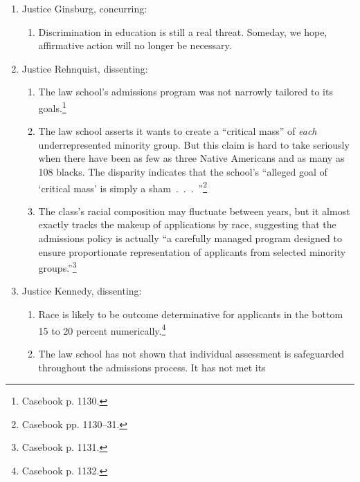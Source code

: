 \begin{enumerate}
\begin{enumerate}
        the school to sacrifice its ``nuanced judgment,'' which would harm 
        other educational values.\footnote{Casebook p. 1129.}
        \item ``[R]ace-conscious policies must be limited in time.~.~.~.~We 
        expect that 25 years from now, the use of racial preferences will no 
        longer be necessary to further the interest approved 
        today.''\footnote{Casebook p. 1129.}
    \end{enumerate}
    \item Justice Ginsburg, concurring:
    \begin{enumerate}
        \item Discrimination in education is still a real threat. Someday, 
        we hope, affirmative action will no longer be necessary.
    \end{enumerate}
    \item Justice Rehnquist, dissenting:
    \begin{enumerate}
        \item The law school's admissions program was not narrowly tailored to 
        its goals.\footnote{Casebook p. 1130.}
        \item The law school asserts it wants to create a ``critical mass'' of 
        \emph{each} underrepresented minority group. But this claim is hard to 
        take seriously when there have been as few as three Native Americans 
        and as many as 108 blacks. The disparity indicates that the school's 
        ``alleged goal of `critical mass' is simply a 
        sham~.~.~.~''\footnote{Casebook pp. 1130--31.}
        \item The class's racial composition may fluctuate between years, but 
        it almost exactly tracks the makeup of applications by race, 
        suggesting that the admissions policy is actually ``a carefully 
        managed program designed to ensure proportionate representation of 
        applicants from selected minority groups.''\footnote{Casebook p. 1131.}
    \end{enumerate}
    \item Justice Kennedy, dissenting:
    \begin{enumerate}
        \item Race is likely to be outcome determinative for applicants in the 
        bottom 15 to 20 percent numerically.\footnote{Casebook p. 1132.}
        \item The law school has not shown that individual assessment is 
        safeguarded throughout the admissions process. It has not met its 

\end{enumerate}
\end{enumerate}
